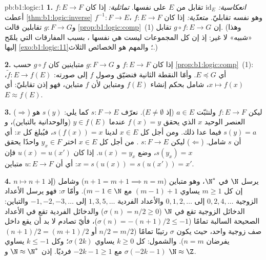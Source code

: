 \begin{solution}{pb:b1:logic:1}
\textbf{1.} \emph{انعكاسية:}  $\mathrm{id}_E$ تقابل من $E$
على نفسها. \emph{تماثلية:} إذا كان $f \colon E \to F$ 
أعطت \cref{thm:b1:logic:inverse}  $f^{-1} \colon F \to E$، وهو نفسه
تقابليّ. \emph{متعدّية:} إذا كان $f \colon E \to F$ و$g \colon F
\to G$ تقابلين قالت \cref{prop:b1:logic:comp}~(1) إن $g \circ f
\colon E \to G$ تقابل. (وهذا «شبيه»  لا غير: إذ إن
 كل المجموعات ليست هي نفسها ، بسبب المفارقات التي
يلمّح إليها \cref{exo:b1:logic:11}؛ والمهم هو الخصائص الثلاث.)

\textbf{2.} إذا كان $f \colon E \to F$ و $g \colon F \to G$
متباينين كان $g \circ f$  حسب \cref{prop:b1:logic:comp}~(1):
أي $E \preceq G$. وأمّا النقطة الثانية فنضيّق  وصول $f$ إلى
صورته:  $\tilde f \colon E \to f(E)$، $x \mapsto f(x)$، شامل بحكم
إنشاء $f(E)$ ومتباين لأن $f$ متباين، فهو إذن تقابليّ:
أي $E \approx f(E)$.

\textbf{3.} ($\Rightarrow$) ليكن $f \colon E \to F$ 
ولنثبّت $a \in E$ (إذ $E \neq \emptyset$). نعرّف $s \colon F \to E$
كما يلي: $s(y)$ هو العنصر الوحيد $x$ الذي يحقق $f(x) = y$ عندما
$y \in f(E)$ (والوحدانية بالتباين)، و $s(y) = a$ فيما عدا ذلك.
ومن أجل كل $x
\in E$ لدينا $s(f(x)) = x$، فيُبلغ كل $x$: أي أن $s$ شامل.
($\Leftarrow$) ليكن $s \colon F \to E$ . من أجل كل $x \in
E$ اختر $y_x \in F$ واحدًا يحقق $s(y_x) = x$، وضع $u(x) = y_x$. إذا
كان $u(x) = u(x')$ فإن $x = s(u(x)) = s(u(x')) = x'$: أي أن $u \colon E \to F$
متباين.

\textbf{4.}  $n \mapsto n + 1$ يرسل $\N$ في $\N^*$، وهو
متباين ($n + 1 = m + 1 \implies n = m$) وشامل (إذ إن كل $m \geq 1$ يساوي
$(m - 1) + 1$ مع $m - 1 \in \N$). وأمّا $\sigma$: فهو يرسل الأعداد
الزوجية $0, 2, 4, \dots$ إلى $0, 1, 2, \dots$ والأعداد الفردية $1, 3,
5, \dots$ إلى $-1, -2, -3, \dots$ والتباين: الدخائل الزوجية تقع في
$\N$ ($\sigma(n) = n/2 \geq 0$) والدخائل الفردية تقع في الأعداد
الصحيحة السالبة تمامًا ($\sigma(n) = -(n+1)/2 \leq -1$)، فأيّ
تصادم لا بد أن يقع داخل صف زوجية واحد، حيث يكون $\sigma$ رتيبًا
تمامًا ($n/2 = m/2$ أو $(n+1)/2 = (m+1)/2$ يفرضان $n =
m$). والشمول: كل $k \geq 0$ يساوي $\sigma(2k)$؛ وكل $k \leq -1$
يساوي $\sigma(-2k - 1)$ مع $-2k - 1 \geq 1$ فرديًا. إذن
$\N \approx \N^*$ و $\N \approx \Z$.


\end{solution}
